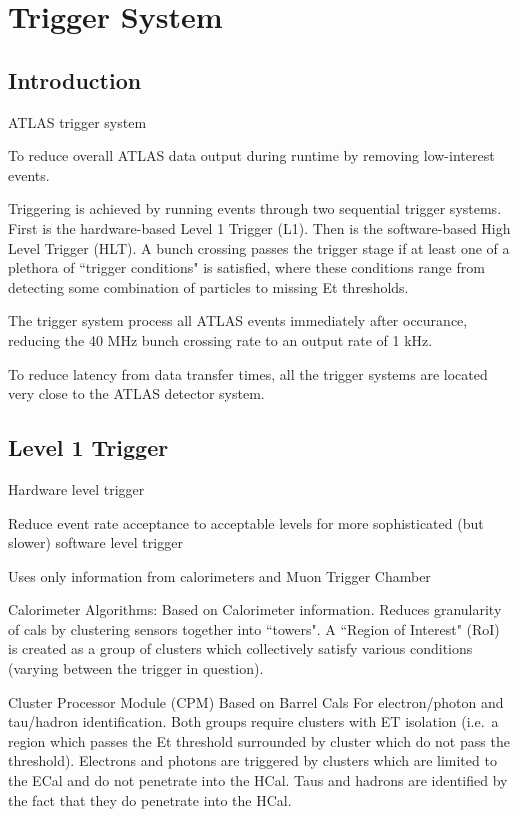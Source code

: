 \chapter{Trigger System} %
\section{Introduction}
ATLAS trigger system

To reduce overall ATLAS data output during runtime by removing low-interest events.

Triggering is achieved by running events through two sequential trigger systems.
First is the hardware-based Level 1 Trigger (L1).
Then is the software-based High Level Trigger (HLT).
A bunch crossing passes the trigger stage if at least one of a plethora of ``trigger conditions" is satisfied, where these conditions range from detecting some combination of particles to missing Et thresholds.

The trigger system process all ATLAS events immediately after occurance, reducing the 40 MHz bunch crossing rate to an output rate of 1 kHz.

To reduce latency from data transfer times, all the trigger systems are located very close to the ATLAS detector system.



\section{Level 1 Trigger}

Hardware level trigger

Reduce event rate acceptance to acceptable levels for more sophisticated (but slower) software level trigger

Uses only information from calorimeters and Muon Trigger Chamber


Calorimeter Algorithms: \cite{L1_calo_run1}
    Based on Calorimeter information.
    Reduces granularity of cals by clustering sensors together into ``towers".
    A ``Region of Interest" (RoI) is created as a group of clusters which collectively satisfy various conditions (varying between the trigger in question).

    Cluster Processor Module (CPM)
        Based on Barrel Cals
        For electron/photon and tau/hadron identification.
        Both groups require clusters with ET isolation (i.e.\ a region which passes the Et threshold surrounded by cluster which do not pass the threshold).
        Electrons and photons are triggered by clusters which are limited to the ECal and do not penetrate into the HCal.
        Taus and hadrons are identified by the fact that they do penetrate into the HCal.

